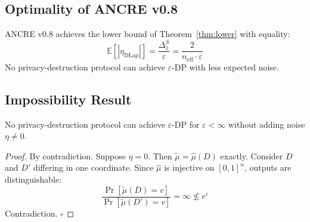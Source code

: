 \subsection{Optimality of ANCRE v0.8}

\begin{corollary}
ANCRE v0.8 achieves the lower bound of
Theorem~\ref{thm:lower} with equality:
\[
\mathbb{E}[|\eta_{\mathrm{DLap}}|]
= \frac{\Delta_1^S}{\varepsilon}
= \frac{2}{n_{\mathrm{eff}} \cdot \varepsilon}
\]
No privacy-destruction protocol can achieve
$\varepsilon$-DP with less expected noise.
\end{corollary}

\subsection{Impossibility Result}

\begin{theorem}
\label{thm:impossible}
No privacy-destruction protocol can achieve
$\varepsilon$-DP for $\varepsilon < \infty$
without adding noise $\eta \neq 0$.
\end{theorem}

\begin{proof}
By contradiction. Suppose $\eta = 0$.
Then $\tilde{\mu} = \hat{\mu}(D)$ exactly.
Consider $D$ and $D'$ differing in one
coordinate. Since $\hat{\mu}$ is injective
on $[0,1]^n$, outputs are distinguishable:
\[
\frac{\Pr[\tilde{\mu}(D)=v]}
     {\Pr[\tilde{\mu}(D')=v]}
= \infty \not\leq e^\varepsilon
\]
Contradiction. $\square$
\end{proof}
